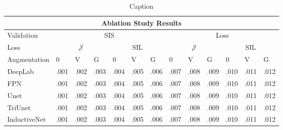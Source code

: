 \begin{table}[h]
    \centering
    \noindent
    \scriptsize
        \begin{tabularx}{\linewidth}{lXXXXXXXXXXXX}
            \toprule
            \multicolumn{13}{c}{\textbf{Ablation Study Results}}\\
            \toprule
            Validation&\multicolumn{6}{c}{SIS} & \multicolumn{6}{c}{Loss} \\
            \cmidrule(lr){2-7} \cmidrule(lr){8-13}
           Loss &\multicolumn{3}{c}{\(\mathcal{J}\)} & \multicolumn{3}{c}{SIL}&\multicolumn{3}{c}{\(\mathcal{J}\)} & \multicolumn{3}{c}{SIL}\\
            \cmidrule(lr){2-4} \cmidrule(lr){5-7} \cmidrule(lr){8-10} \cmidrule(lr){11-13}
            Augmentation & 0 & V & G & 0 & V & G & 0 & V & G& 0 & V & G\\
            \midrule
            DeepLab & .001 & .002 & .003 & .004 & .005 & .006 & .007 & .008 & .009 & .010 & .011 & .012\\
            FPN & .001 & .002 & .003 & .004 & .005 & .006 & .007 & .008 & .009 & .010 & .011 & .012\\
            Unet & .001 & .002 & .003 & .004 & .005 & .006 & .007 & .008 & .009 & .010 & .011 & .012\\
            TriUnet & .001 & .002 & .003 & .004 & .005 & .006 & .007 & .008 & .009 & .010 & .011 & .012\\
            InductiveNet & .001 & .002 & .003 & .004 & .005 & .006 & .007 & .008 & .009 & .010 & .011 & .012\\
            \bottomrule
        \end{tabularx}
    \caption{Caption}
    \label{tab:ablation_auc}
\end{table}